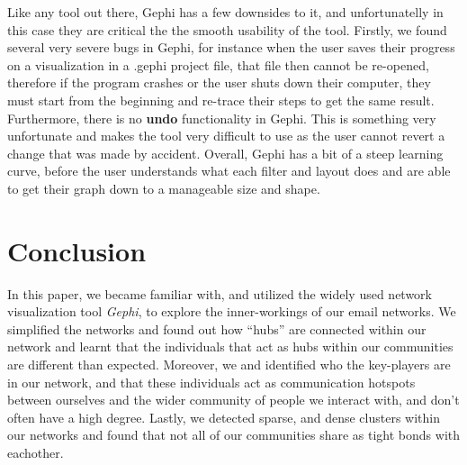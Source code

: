 \documentclass[11pt,letterpaper]{article}
\begin{document}
Like any tool out there, Gephi has a few downsides to it, and unfortunatelly in this case they are critical the the smooth usability of the tool. Firstly, we found several very severe bugs in Gephi, for instance when the user saves their progress on a visualization in a .gephi project file, that file then cannot be re-opened, therefore if the program crashes or the user shuts down their computer, they must start from the beginning and re-trace their steps to get the same result. Furthermore, there is no \textbf{undo} functionality in Gephi. This is something very unfortunate and makes the tool very difficult to use as the user cannot revert a change that was made by accident. Overall, Gephi has a bit of a steep learning curve, before the user understands what each filter and layout does and are able to get their graph down to a manageable size and shape.

\section*{Conclusion}

In this paper, we became familiar with, and utilized the widely used network visualization tool \textit{Gephi}, to explore the inner-workings of our email networks. We simplified the networks and found out how ``hubs'' are connected within our network and learnt that the individuals that act as hubs within our communities are different than expected. Moreover, we and identified who the key-players are in our network, and that these individuals act as communication hotspots between ourselves and the wider community of people we interact with, and don't often have a high degree. Lastly, we detected sparse, and dense clusters within our networks and found that not all of our communities share as tight bonds with eachother.




\end{document}
